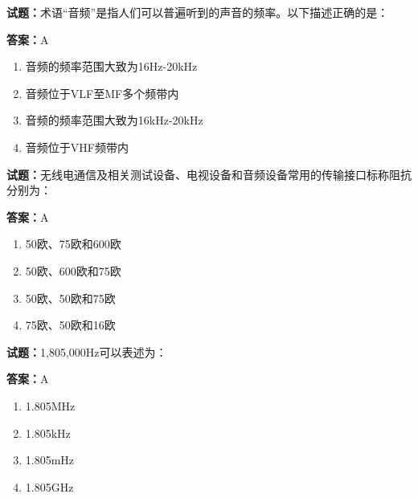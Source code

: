 \documentclass{ctexbook}
\begin{document}




\vspace{1em}

\textbf{试题：}术语“音频”是指人们可以普遍听到的声音的频率。以下描述正确的是： 

\textbf{答案：}A 

\begin{enumerate}[leftmargin=3em]
  \item 音频的频率范围大致为16Hz-20kHz 

  \item 音频位于VLF至MF多个频带内 

  \item 音频的频率范围大致为16kHz-20kHz 

  \item 音频位于VHF频带内 

\end{enumerate}





\vspace{1em}

\textbf{试题：}无线电通信及相关测试设备、电视设备和音频设备常用的传输接口标称阻抗分别为： 

\textbf{答案：}A 

\begin{enumerate}[leftmargin=3em]
  \item 50欧、75欧和600欧 

  \item 50欧、600欧和75欧 


  \item 50欧、50欧和75欧 

  \item 75欧、50欧和16欧 

\end{enumerate}





\vspace{1em}

\textbf{试题：}1,805,000Hz可以表述为： 

\textbf{答案：}A 

\begin{enumerate}[leftmargin=3em]
  \item 1.805MHz 

  \item 1.805kHz 

  \item 1.805mHz 

  \item 1.805GHz 

\end{enumerate}
\end{document}
